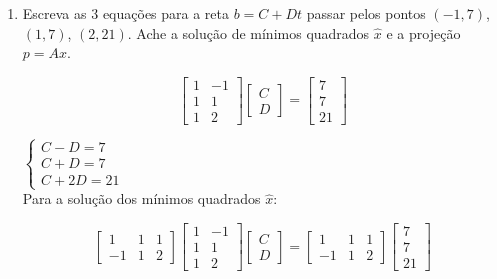 \documentclass[leqno]{article}
\numberwithin{equation}{section}
\begin{document}
	\begin{enumerate}
		
		
		\item Escreva as 3 equações para a reta $b = C + Dt$ passar pelos pontos $(-1,7)$, $(1,7)$, $(2,21)$. Ache a solução de mínimos quadrados $\hat{x}$ e a projeção $p = A\hat{x}$.
		
		\begin{sol}
			
			$$\begin{bmatrix}
				1 & -1 \\
				1 & 1 \\
				1 & 2
			\end{bmatrix}\begin{bmatrix}
			C \\
			D
			\end{bmatrix} = \begin{bmatrix}
			7 \\
			7 \\
			21
			\end{bmatrix}$$
			
		$
		\left\{
		\begin {array}{cl}
		C - D = 7\\
		C + D = 7\\
		C + 2D = 21
		\end{array}
		\right.
		$\\
		
		Para a solução dos mínimos quadrados $\hat{x}$:
		
		$$\begin{bmatrix}
			1 & 1 & 1\\
			-1 & 1 & 2
		\end{bmatrix}\begin{bmatrix}
			1 & -1 \\
			1 & 1 \\
			1 & 2
		\end{bmatrix}\begin{bmatrix}
		C \\
		D
		\end{bmatrix} = \begin{bmatrix}
		1 & 1 & 1\\
		-1 & 1 & 2
		\end{bmatrix} \begin{bmatrix}
		7 \\
		7 \\
		21
		\end{bmatrix}$$
	

\end{sol}
\end{enumerate}
\end{document}
